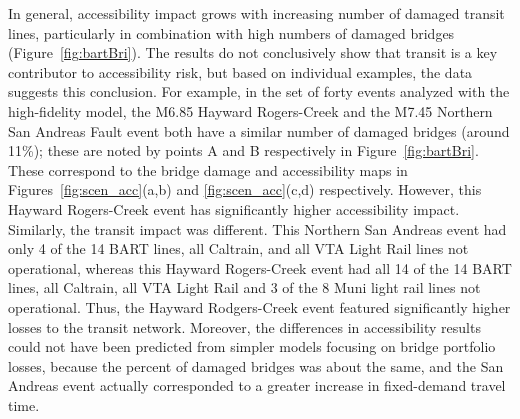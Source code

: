In general, accessibility impact grows with increasing number of damaged transit lines, particularly in combination with high numbers of damaged bridges (Figure~\ref{fig:bartBri}). The results do not conclusively show that transit is a key contributor to accessibility risk, but based on individual examples, the data suggests this conclusion. For example, in the set of forty events analyzed with the high-fidelity model, the M6.85 Hayward Rogers-Creek and the M7.45 Northern San Andreas Fault event both have a similar number of damaged bridges (around 11\%); these are noted by points A and B respectively in Figure~\ref{fig:bartBri}. These correspond to the bridge damage and accessibility maps in Figures~\ref{fig:scen_acc}{(a,b)} and \ref{fig:scen_acc}{(c,d)} respectively.  However, this Hayward Rogers-Creek event has significantly higher accessibility impact. Similarly, the transit impact was different. This Northern San Andreas event had only 4 of the 14 BART lines, all Caltrain, and all VTA Light Rail lines not operational, whereas this Hayward Rogers-Creek event had all 14 of the 14 BART lines, all Caltrain, all VTA Light Rail and 3 of the 8 Muni light rail lines not operational.  Thus, the Hayward Rodgers-Creek event featured significantly higher losses to the transit network.
Moreover, the differences in accessibility results could not have been predicted from simpler models focusing on bridge portfolio losses, because the percent of damaged bridges was about the same, and the San Andreas event actually corresponded to a greater increase in fixed-demand travel time.


